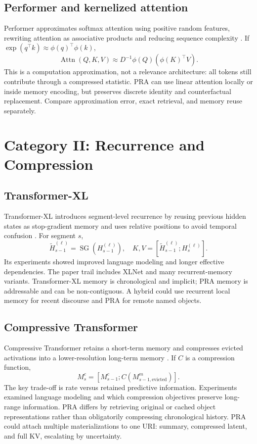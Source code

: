 \documentclass[10pt,a4paper]{article}
\begin{document}
\subsection{Performer and kernelized attention}
Performer approximates softmax attention using positive random features, rewriting attention as associative products and reducing sequence complexity \citep{choromanski2021performer}. If $\exp(q^\top k)\approx \phi(q)^\top\phi(k)$,
\begin{equation}
\operatorname{Attn}(Q,K,V)\approx D^{-1}\phi(Q)\left(\phi(K)^\top V\right).
\end{equation}
This is a computation approximation, not a relevance architecture: all tokens still contribute through a compressed statistic. PRA can use linear attention locally or inside memory encoding, but preserves discrete identity and counterfactual replacement. Compare approximation error, exact retrieval, and memory reuse separately.

\section{Category II: Recurrence and Compression}
\subsection{Transformer-XL}
Transformer-XL introduces segment-level recurrence by reusing previous hidden states as stop-gradient memory and uses relative positions to avoid temporal confusion \citep{dai2019transformerxl}. For segment $s$,
\begin{equation}
\tilde H_{s-1}^{(\ell)}=\operatorname{SG}(H_{s-1}^{(\ell)}),\quad K,V=[\tilde H_{s-1}^{(\ell)};H_s^{(\ell)}].
\end{equation}
Its experiments showed improved language modeling and longer effective dependencies. The paper trail includes XLNet and many recurrent-memory variants. Transformer-XL memory is chronological and implicit; PRA memory is addressable and can be non-contiguous. A hybrid could use recurrent local memory for recent discourse and PRA for remote named objects.

\subsection{Compressive Transformer}
Compressive Transformer retains a short-term memory and compresses evicted activations into a lower-resolution long-term memory \citep{rae2020compressive}. If $C$ is a compression function,
\begin{equation}
M^{c}_{s}= [M^{c}_{s-1}; C(M^{m}_{s-1,\mathrm{evicted}})].
\end{equation}
The key trade-off is rate versus retained predictive information. Experiments examined language modeling and which compression objectives preserve long-range information. PRA differs by retrieving original or cached object representations rather than obligatorily compressing chronological history. PRA could attach multiple materializations to one URI: summary, compressed latent, and full KV, escalating by uncertainty.
\end{document}
